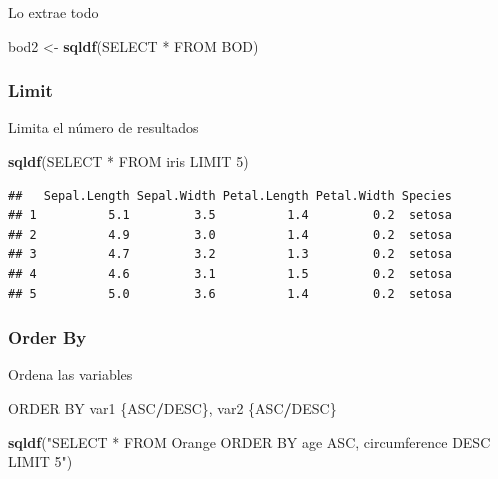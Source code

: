 \documentclass[
]{book}
\newenvironment{Shaded}{\begin{snugshade}}{\end{snugshade}}
\newcommand{\FunctionTok}[1]{\textcolor[rgb]{0.13,0.29,0.53}{\textbf{#1}}}
\newcommand{\NormalTok}[1]{#1}
\newcommand{\OtherTok}[1]{\textcolor[rgb]{0.56,0.35,0.01}{#1}}
\newcommand{\SpecialCharTok}[1]{\textcolor[rgb]{0.81,0.36,0.00}{\textbf{#1}}}
\newcommand{\StringTok}[1]{\textcolor[rgb]{0.31,0.60,0.02}{#1}}
\begin{document}
Lo extrae todo

\begin{Shaded}
\begin{Highlighting}[]
\NormalTok{bod2 }\OtherTok{\textless{}{-}} \FunctionTok{sqldf}\NormalTok{(}\StringTok{\textquotesingle{}SELECT * FROM BOD\textquotesingle{}}\NormalTok{)}
\end{Highlighting}
\end{Shaded}

\hypertarget{limit}{%
\subsubsection{Limit}\label{limit}}

Limita el número de resultados

\begin{Shaded}
\begin{Highlighting}[]
\FunctionTok{sqldf}\NormalTok{(}\StringTok{\textquotesingle{}SELECT * FROM iris LIMIT 5\textquotesingle{}}\NormalTok{)}
\end{Highlighting}
\end{Shaded}

\begin{verbatim}
##   Sepal.Length Sepal.Width Petal.Length Petal.Width Species
## 1          5.1         3.5          1.4         0.2  setosa
## 2          4.9         3.0          1.4         0.2  setosa
## 3          4.7         3.2          1.3         0.2  setosa
## 4          4.6         3.1          1.5         0.2  setosa
## 5          5.0         3.6          1.4         0.2  setosa
\end{verbatim}

\hypertarget{order-by}{%
\subsubsection{Order By}\label{order-by}}

Ordena las variables

\begin{Shaded}
\begin{Highlighting}[]
\NormalTok{ORDER BY var1 \{ASC}\SpecialCharTok{/}\NormalTok{DESC\}, var2 \{ASC}\SpecialCharTok{/}\NormalTok{DESC\}}
\end{Highlighting}
\end{Shaded}

\begin{Shaded}
\begin{Highlighting}[]
\FunctionTok{sqldf}\NormalTok{(}\StringTok{"SELECT * FROM Orange ORDER BY age ASC, circumference DESC LIMIT 5"}\NormalTok{)}
\end{Highlighting}
\end{Shaded}
\end{document}
